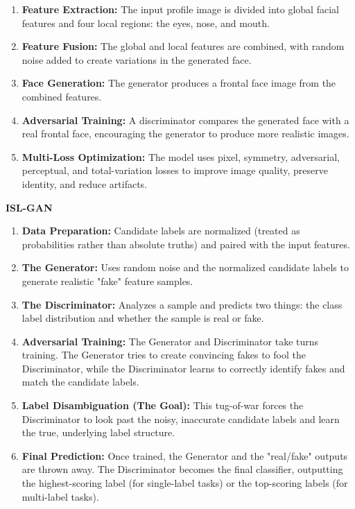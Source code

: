 \documentclass[12pt,a4paper]{article}
\begin{document}
\begin{enumerate}
    \item \textbf{Feature Extraction:} The input profile image is divided into global facial features and four local regions: the eyes, nose, and mouth.
    \item \textbf{Feature Fusion:} The global and local features are combined, with random noise added to create variations in the generated face.
    \item \textbf{Face Generation:} The generator produces a frontal face image from the combined features.
    \item \textbf{Adversarial Training:} A discriminator compares the generated face with a real frontal face, encouraging the generator to produce more realistic images.
    \item \textbf{Multi-Loss Optimization:} The model uses pixel, symmetry, adversarial, perceptual, and total-variation losses to improve image quality, preserve identity, and reduce artifacts.
\end{enumerate}
\textbf{ISL-GAN}
\begin{enumerate}
    \item \textbf{Data Preparation:} Candidate labels are normalized (treated as probabilities rather than absolute truths) and paired with the input features.
    \item \textbf{The Generator:} Uses random noise and the normalized candidate labels to generate realistic "fake" feature samples.
    \item \textbf{The Discriminator:} Analyzes a sample and predicts two things: the class label distribution and whether the sample is real or fake.
    \item \textbf{Adversarial Training:} The Generator and Discriminator take turns training. The Generator tries to create convincing fakes to fool the Discriminator, while the Discriminator learns to correctly identify fakes and match the candidate labels.
    \item \textbf{Label Disambiguation (The Goal):} This tug-of-war forces the Discriminator to look past the noisy, inaccurate candidate labels and learn the true, underlying label structure.
    \item \textbf{Final Prediction:} Once trained, the Generator and the "real/fake" outputs are thrown away. The Discriminator becomes the final classifier, outputting the highest-scoring label (for single-label tasks) or the top-scoring labels (for multi-label tasks).
\end{enumerate}
\end{document}
